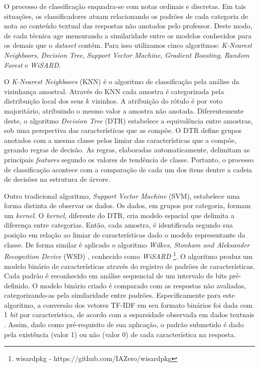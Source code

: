 O processo de classificação enquadra-se com notas ordinais e discretas. Em tais situações, os classificadores atuam relacionando os padrões de cada categoria de nota ao conteúdo textual das respostas não anotados pelo professor. Deste modo, de cada técnica age mensurando a similaridade entre os modelos conhecidos para os demais que o \textit{dataset} contém. Para isso utilizamos cinco algoritmos: \textit{K-Nearest Neighboors}, \textit{Decision Tree}, \textit{Support Vector Machine}, \textit{Gradient Boosting}, \textit{Random Forest} e \textit{WiSARD}.

O \textit{K-Nearest Neighboors} (KNN) é o algoritmo de classificação pela análise da vizinhança amostral. Através do KNN cada amostra é categorizada pela distribuição local dos seus $ k $ vizinhos. A atribuição do rótulo é por voto majoritário, atribuindo o mesmo valor a amostra não anotada. Diferentemente deste, o algoritmo \textit{Decision Tree} (DTR) estabelece a equivalência entre amostras, sob uma perspectiva das características que as compõe. O DTR define grupos anotados com a mesma classe pelos limiar das características que a compõe, gerando regras de decisão. As regras, elaboradas automaticamente, delimitam as principais \textit{features} segundo os valores de tendência de classe. Portanto, o processo de classificação acontece com a comparação de cada um dos itens dentre a cadeia de decisões na estrutura de árvore.

Outro tradicional algoritmo, \textit{Support Vector Machine} (SVM), estabelece uma forma distinta de observar os dados. Os dados, em grupos por categoria, formam um \textit{kernel}. O \textit{kernel}, diferente do DTR, cria modelo espacial que delimita a diferença entre categorias. Então, cada amostra, é identificada segundo sua posição em relação ao limiar de características dado o modelo representante da classe. De forma similar é aplicado o algoritmo \textit{Wilkes, Stonham and Aleksander Recognition Device} (WSD) \cite{aleksander1984, wisard2020}, conhecido como \textit{WiSARD} \footnote{wisardpkg - https://github.com/IAZero/wisardpkg}. O algoritmo produz um modelo binário de características através do registro de padrões de características. Cada padrão é reconhecido em análise sequencial de um intervalo de bits pré-definido. O modelo binário criado é comparado com as respostas não avaliadas, categorizando-as pela similaridade entre padrões. Especificamente para este algoritmo, a conversão dos vetores TF-IDF em seu formato binários foi dada com 1 \textit{bit} por característica, de acordo com a esparsidade observada em dados textuais \cite{manning1999}. Assim, dado como pré-requisito de sua aplicação, o padrão submetido é dado pela existência (valor 1) ou não (valor 0) de cada característica na resposta.

